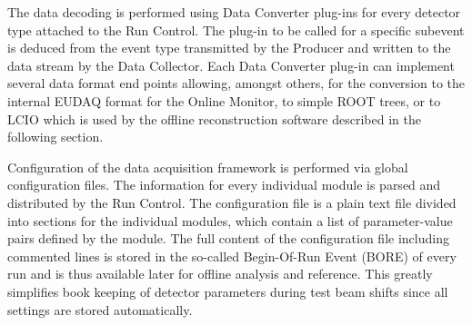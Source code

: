The data decoding is performed using Data Converter plug-ins for every detector type attached to the Run Control. 
The plug-in to be called for a specific subevent is deduced from the event type transmitted by the Producer and written to the data stream by the Data Collector. 
Each Data Converter plug-in can implement several data format end points allowing, amongst others, for the conversion to the internal EUDAQ format for the Online Monitor, to simple ROOT trees, or to LCIO
 which is used by the offline reconstruction software described in the following section.

Configuration of the data acquisition framework is performed via global configuration files. 
The information for every individual module is parsed and distributed by the Run Control. 
The configuration file is a plain text file divided into sections for the individual modules, which contain a list of parameter-value pairs defined by the module.
The full content of the configuration file including commented lines is stored in the so-called Begin-Of-Run Event (BORE) of every run and is thus available later for offline analysis and reference. 
This greatly simplifies book keeping of detector parameters during test beam shifts since all settings are stored automatically.
